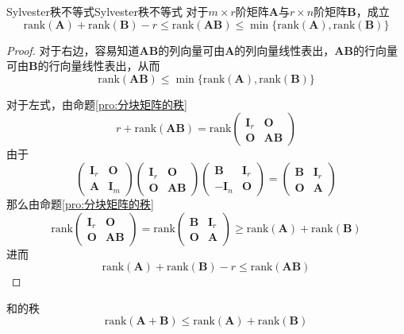 \documentclass[lang = cn, scheme = chinese, thmcnt = section]{elegantbook}
\newcommand{\bs}{\boldsymbol}          %
\newcommand{\rank}{\text{rank}}        %
\begin{document}
\begin{proposition}{Sylvester秩不等式}{Sylvester秩不等式}
	对于$m\times r$阶矩阵$\bs{A}$与$r\times n$阶矩阵$\bs{B}$，成立
	$$
	\rank(\bs{A})+\rank(\bs{B})-r\le
	\rank(\bs{AB})\le\min\{ \rank(\bs{A}),\rank(\bs{B}) \}
	$$
\end{proposition}

\begin{proof}
	对于右边，容易知道$\bs{AB}$的列向量可由$\bs{A}$的列向量线性表出，$\bs{AB}$的行向量可由$\bs{B}$的行向量线性表出，从而
	$$
	\rank(\bs{AB})\le\min\{ \rank(\bs{A}),\rank(\bs{B}) \}
	$$
	
	对于左式，由命题\ref{pro:分块矩阵的秩}%
	$$
	r+\rank(\bs{AB})
	=\rank\begin{pmatrix}
		\bs{I}_r & \bs{O}\\
		\bs{O} & \bs{AB}
	\end{pmatrix}
	$$
	由于%
	$$
	\begin{pmatrix}
		\bs{I}_r & \bs{O}\\
		\bs{A} & \bs{I}_m
	\end{pmatrix}
	\begin{pmatrix}
		\bs{I}_r & \bs{O}\\
		\bs{O} & \bs{AB}
	\end{pmatrix}
	\begin{pmatrix}
		\bs{B} & \bs{I}_r\\
		-\bs{I}_n & \bs{O}
	\end{pmatrix}
	=\begin{pmatrix}
		\bs{B} & \bs{I}_r\\
		\bs{O} & \bs{A}
	\end{pmatrix}
	$$
	那么由命题\ref{pro:分块矩阵的秩}%
	$$
	\rank\begin{pmatrix}
		\bs{I}_r & \bs{O}\\
		\bs{O} & \bs{AB}
	\end{pmatrix}
	=\rank\begin{pmatrix}
		\bs{B} & \bs{I}_r\\
		\bs{O} & \bs{A}
	\end{pmatrix}
	\ge\rank(\bs{A})+\rank(\bs{B})
	$$
	进而%
	$$
	\rank(\bs{A})+\rank(\bs{B})-r\le
	\rank(\bs{AB})
	$$
\end{proof}

\begin{proposition}{和的秩}
	$$
	\rank(\bs{A}+\bs{B})\le\rank(\bs{A})+\rank(\bs{B})
	$$
\end{proposition}
\end{document}
